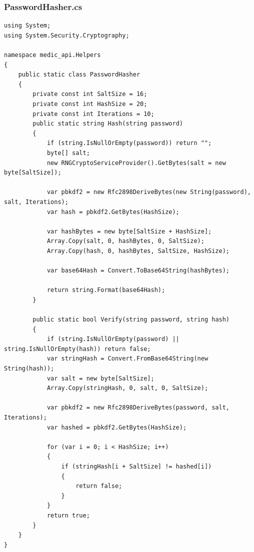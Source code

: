 \documentclass[12pt,a4paper]{article}
\begin{document}
	\subsubsection{PasswordHasher.cs}
	\begin{lstlisting}
using System;
using System.Security.Cryptography;

namespace medic_api.Helpers
{
    public static class PasswordHasher
    {
        private const int SaltSize = 16;
        private const int HashSize = 20;
        private const int Iterations = 10;
        public static string Hash(string password)
        {
            if (string.IsNullOrEmpty(password)) return "";
            byte[] salt;
            new RNGCryptoServiceProvider().GetBytes(salt = new byte[SaltSize]);

            var pbkdf2 = new Rfc2898DeriveBytes(new String(password), salt, Iterations);
            var hash = pbkdf2.GetBytes(HashSize);

            var hashBytes = new byte[SaltSize + HashSize];
            Array.Copy(salt, 0, hashBytes, 0, SaltSize);
            Array.Copy(hash, 0, hashBytes, SaltSize, HashSize);

            var base64Hash = Convert.ToBase64String(hashBytes);

            return string.Format(base64Hash);
        }

        public static bool Verify(string password, string hash)
        {
            if (string.IsNullOrEmpty(password) || string.IsNullOrEmpty(hash)) return false;
            var stringHash = Convert.FromBase64String(new String(hash));
            var salt = new byte[SaltSize];
            Array.Copy(stringHash, 0, salt, 0, SaltSize);

            var pbkdf2 = new Rfc2898DeriveBytes(password, salt, Iterations);
            var hashed = pbkdf2.GetBytes(HashSize);

            for (var i = 0; i < HashSize; i++)
            {
                if (stringHash[i + SaltSize] != hashed[i])
                {
                    return false;
                }
            }
            return true;
        }
    }
}
	\end{lstlisting}
\end{document}

